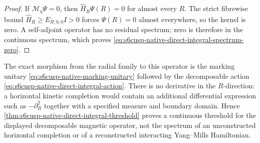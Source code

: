 \begin{proof}
If \(\mathscr M_\eta\Psi=0\), then
\(\widehat H_R\Psi(R)=0\) for almost every \(R\).  The strict fibrewise
bound
\(\widehat H_R\ge E_{R;0,0}I>0\) forces \(\Psi(R)=0\) almost everywhere,
so the kernel is zero.  A self-adjoint operator has no residual spectrum;
zero is therefore in the continuous spectrum, which proves
\eqref{eq:s6cusp-native-direct-integral-spectrum-zero}.
\end{proof}

The exact morphism from the radial family to this operator is the marking
unitary \eqref{eq:s6cusp-native-marking-unitary} followed by the decomposable
action \eqref{eq:s6cusp-native-direct-integral-action}.  There is no
derivative in the \(R\)-direction: a horizontal kinetic completion would
contain an additional differential expression such as \(-\partial_R^2\)
together with a specified measure and boundary domain.  Hence
\cref{thm:s6cusp-native-direct-integral-threshold} proves a continuous
threshold for the displayed decomposable magnetic operator, not the
spectrum of an unconstructed horizontal completion or of a reconstructed
interacting Yang--Mills Hamiltonian.
